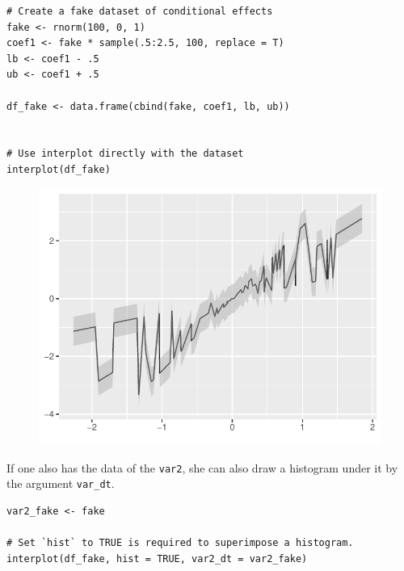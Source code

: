 \documentclass[
  article]{jss}
\begin{document}
\begin{verbatim}
# Create a fake dataset of conditional effects
fake <- rnorm(100, 0, 1)
coef1 <- fake * sample(.5:2.5, 100, replace = T)
lb <- coef1 - .5
ub <- coef1 + .5

df_fake <- data.frame(cbind(fake, coef1, lb, ub))


# Use interplot directly with the dataset
interplot(df_fake)
\end{verbatim}

\begin{figure}[H]

{\centering \includegraphics{jss_manuscript_files/figure-pdf/unnamed-chunk-19-1.pdf}

}

\end{figure}

If one also has the data of the \texttt{var2}, she can also draw a
histogram under it by the argument \texttt{var\_dt}.

\begin{verbatim}
var2_fake <- fake

# Set `hist` to TRUE is required to superimpose a histogram.
interplot(df_fake, hist = TRUE, var2_dt = var2_fake)
\end{verbatim}
\end{document}

